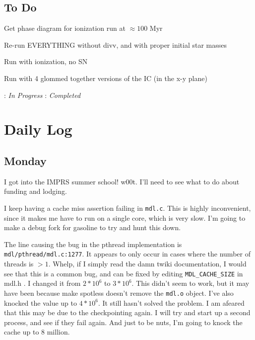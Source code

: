 \documentclass[11pt,letterpaper]{article}
\begin{document}
\subsection*{To Do}
\begin{bullets} 
\item \checkmark Get phase diagram for ionization run at $\approx 100$ Myr
\item \textleaf Re-run EVERYTHING without divv, and with proper initial star masses
\item \textleaf Run with ionization, no SN
\item Run with 4 glommed together versions of the IC (in the x-y plane)
\end{bullets}

\textleaf : \textit{In Progress} \qquad \checkmark : \textit{Completed}

\section*{Daily Log}
\subsection*{Monday}
I got into the IMPRS summer school!  w00t.  I'll need to see what to do about
funding and lodging.

I keep having a cache miss assertion failing in \verb!mdl.c!.  This is highly
inconvenient, since it makes me have to run on a single core, which is very 
slow.  I'm going to make a debug fork for gasoline to try and hunt this down.

The line causing the bug in the pthread implementation is 
\verb!mdl/pthread/mdl.c:1277!.  It appears to only occur in cases where the 
number of threads is $>1$.  Whelp, if I simply read the damn twiki 
documentation, I would see that this is a common bug, and can be fixed by
editing \verb!MDL_CACHE_SIZE! in mdl.h . I changed it from $2*10^6$ to $3*10^6$.
This didn't seem to work, but it may have been because make spotless doesn't 
remove the \verb!mdl.o! object.  I've also knocked the value up to $4*10^6$.
It still hasn't solved the problem.  I am afeared that this may be due to
the checkpointing again.  I will try and start up a second process, and see
if they fail again.  And just to be nuts, I'm going to knock the cache up to 8
million.
\end{document}
